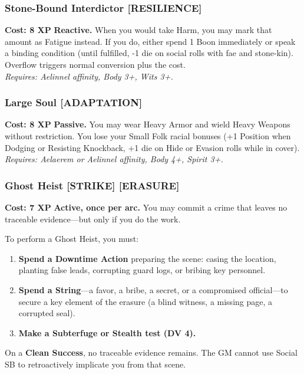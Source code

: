 \documentclass[12pt,a4paper]{book}
\begin{document}
\subsubsection*{Stone-Bound Interdictor \textnormal{[RESILIENCE]}}
\label{talent:stone-bound-interdictor}
\textbf{Cost: 8 XP} \textbf{Reactive.} When you would take Harm, you may mark that amount as Fatigue instead. If you do, either spend 1 Boon immediately or speak a binding condition (until fulfilled, -1 die on social rolls with fae and stone-kin). Overflow triggers normal conversion plus the cost. \\
\textit{Requires: Aelinnel affinity, Body 3+, Wits 3+.}

\subsubsection*{Large Soul \textnormal{[ADAPTATION]}}
\label{talent:large-soul}
\textbf{Cost: 8 XP} \textbf{Passive.} You may wear Heavy Armor and wield Heavy Weapons without restriction. You lose your Small Folk racial bonuses (+1 Position when Dodging or Resisting Knockback, +1 die on Hide or Evasion rolls while in cover). \\
\textit{Requires: Aelaerem or Aelinnel affinity, Body 4+, Spirit 3+.}

\subsubsection*{Ghost Heist \textnormal{[STRIKE] [ERASURE]}}
\label{talent:ghost-heist}
\textbf{Cost: 7 XP} \textbf{Active, once per arc.} You may commit a crime that leaves no traceable evidence---but only if you do the work.

To perform a Ghost Heist, you must:
\begin{enumerate}
    \item \textbf{Spend a Downtime Action} preparing the scene: casing the location, planting false leads, corrupting guard logs, or bribing key personnel.
    \item \textbf{Spend a String}---a favor, a bribe, a secret, or a compromised official---to secure a key element of the erasure (a blind witness, a missing page, a corrupted seal).
    \item \textbf{Make a Subterfuge or Stealth test (DV 4).}
\end{enumerate}

On a \textbf{Clean Success}, no traceable evidence remains. The GM cannot use Social SB to retroactively implicate you from that scene.
\end{document}
